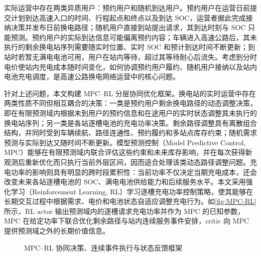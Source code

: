 \documentclass[12pt,a4paper,UTF8]{ctexart}
\begin{document}
实际运营中存在两类异质用户：预约用户和随机到达用户。预约用户在运营日前提交计划到达高速入口的时间、行程起点和终点以及到达 SOC，运营者据此完成接纳决策并发布日前换电路径；随机用户直接到站提出请求，其到达时刻与 SOC 只能预测。预约用户的实际到达信息可能偏离预约内容；车辆进入高速公路后，其未执行的剩余换电站序列需要随实时位置、实时 SOC 和预计到达时间不断更新；到站时若暂无满电电池可用，用户在站内等待，超过其等待耐心后流失。考虑到分时电价使站内充电成本随时间变化，如何协调预约用户履约、随机用户接纳以及站内电池充电调度，是高速公路换电网络运营中的核心问题。

针对上述问题，本文构建 MPC--RL 分层协同优化框架。换电站的实时运营中存在两类性质不同但相互耦合的决策：一类是预约用户剩余换电路径的动态调整决策，即在有限预测域内根据未到用户的预约信息和在途用户的实时状态调整其未执行的换电站序列；另一类是各站逐槽电池的充电功率决策。剩余路径调整具有离散组合结构，并同时受到车辆续航、路径连通性、预约履约和多站点库存约束；随机需求预测与实际到达又随时间不断更新。模型预测控制（Model Predictive Control, MPC）能够在有限预测域内联合评估这些约束和未来库存影响，并在每次获得新观测后重新优化而只执行当前外层区间，因而适合处理该类动态路径调整问题。充电功率的影响则具有明显的跨时段累积性：当前功率不仅决定当期充电成本，还会改变未来各站逐槽电池的 SOC、满电电池供给能力和后续服务水平。本文采用强化学习（Reinforcement Learning, RL）学习逐槽充电功率控制策略，使其能够在长期交互过程中根据需求、电价和电池状态自适应调整充电行为。如\autoref{fig:MPC-RL}所示，RL actor 输出预测域内的逐槽请求充电功率并作为 MPC 的已知参数，MPC 在给定功率下联合优化剩余路径与站内连续服务事件安排，critic 向 MPC 提供预测域之外的长期价值信息。

\begin{figure}[!htbp]
  \centering
  \caption{MPC--RL 协同决策、连续事件执行与状态反馈框架}
  \label{fig:MPC-RL}
\end{figure}
\end{document}
